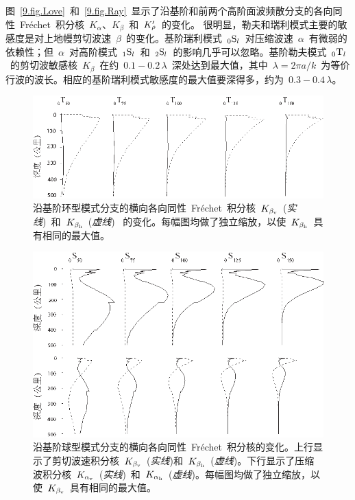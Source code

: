 图~\ref{9.fig.Love}~和~\ref{9.fig.Ray}~显示了沿基阶和前两个高阶面波频散分支的各向同性~Fr\'{e}chet~积分核~$K_{\alpha}$、$K_{\beta}$~和~$K_{\raisebox{0.3 ex}{\scriptsize$\rho$}}^{\prime}$~的变化。
%
%
\enlargethispage{-0.5\baselineskip}
很明显，勒夫和瑞利模式主要的敏感度是对上地幔剪切波速~$\beta$~的变化。基阶瑞利模式~${}_0{\rm S}_l$~对压缩波速~$\alpha$~有微弱的依赖性；但~$\alpha$~对高阶模式~${}_1{\rm S}_l$~和~${}_2{\rm S}_l$~的影响几乎可以忽略。基阶勒夫模式~${}_0{\rm T}_l$~的剪切波敏感核~$K_{\beta}$~在约~$0.1\!-\!0.2\,\lambda$~深处达到最大值，其中~$\lambda=2\pi a/k$~为等价行波的波长。相应的基阶瑞利模式敏感度的最大值要深得多，约为~$0.3\!-\!0.4\,\lambda$。
\begin{figure}[!t]
\begin{center}
\includegraphics{../figures/chap09/fig10.eps}
\end{center}
\caption[anisotropic kernels 1]{
\label{fig:9.10}
沿基阶环型模式分支的横向各向同性~Fr\'{e}chet~积分核~$K_{\beta_{\rm v}}$~({\em 实线\/})~和~$K_{\beta_{\rm h}}$~({\em 虚线\/})~ 的变化。每幅图均做了独立缩放，以使~$K_{\beta_{\rm h}}$~具有相同的最大值。
}
\end{figure}
\begin{figure}[!b]
\begin{center}
\includegraphics{../figures/chap09/fig11.eps}
\end{center}
\caption[anisotropic kernels 2]{
\label{fig:9.11}
沿基阶球型模式分支的横向各向同性~Fr\'{e}chet~积分核的变化。上行显示了剪切波速积分核~$K_{\beta_{\rm v}}$~({\em 实线\/})和~$K_{\beta_{\rm h}}$~({\em 虚线\/})。下行显示了压缩波积分核~$K_{\alpha_{\rm v}}$~({\em 实线\/})~和~$K_{\alpha_{\rm h}}$~({\em 虚线\/})。每幅图均做了独立缩放，以使~$K_{\beta_{\rm v}}$~具有相同的最大值。
}
\end{figure}
